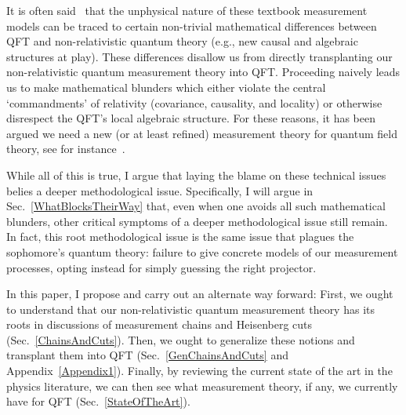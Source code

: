 \documentclass[prd,twocolumn,superscriptaddress,floatfix,amsmath,amssymb,amsfonts,nofootinbib]{revtex4-2}
\begin{document}
It is often said~\cite{pologomez2021detectorbased,Jubb2022,BorstenJubbKells,fewster1,fewster2,fewster3,Anastopoulos2022,Sorkin,TaleOfTwo,Ruep2021,JoseMariaEdu,Sorkin,Redhead1995,Dowker,Dowker2,borsten,alvaro,Adam} that the unphysical nature of these textbook measurement models can be traced to certain non-trivial mathematical differences between QFT and non-relativistic quantum theory (e.g., new causal and algebraic structures at play). These differences disallow us from directly transplanting our non-relativistic quantum measurement theory into QFT. Proceeding naively leads us to make mathematical blunders which either violate the central `commandments' of relativity (covariance, causality, and locality)\cite{Sorkin,Redhead1995,Dowker,Dowker2,borsten,alvaro,Adam} or otherwise disrespect the QFT's local algebraic structure. For these reasons, it has been argued we need a new (or at least refined) measurement theory for quantum field theory, see for instance~\cite{pologomez2021detectorbased,Jubb2022,fewster2}.

While all of this is true, I argue that laying the blame on these technical issues belies a deeper methodological issue. Specifically, I will argue in Sec.~\ref{WhatBlocksTheirWay} that, even when one avoids all such mathematical blunders, other critical symptoms of a deeper methodological issue still remain. In fact, this root methodological issue is the same issue that plagues the sophomore's quantum theory: failure to give concrete models of our measurement processes, opting instead for simply guessing the right projector.

In this paper, I propose and carry out an alternate way forward: First, we ought to understand that our non-relativistic quantum measurement theory has its roots in discussions of measurement chains and Heisenberg cuts (Sec.~\ref{ChainsAndCuts}). Then, we ought to generalize these notions and transplant them into QFT (Sec.~\ref{GenChainsAndCuts} and Appendix~\ref{Appendix1}). Finally, by reviewing the current state of the art in the physics literature, we can then see what measurement theory, if any, we currently have for QFT (Sec.~\ref{StateOfTheArt}).
\end{document}

